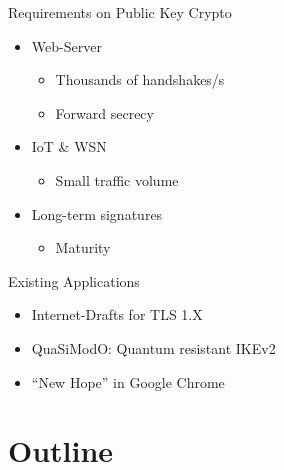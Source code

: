 \documentclass[fleqn,compress,utf8,aspectratio=169,t]{beamer}
\begin{document}
\begin{frame}{Requirements on Public Key Crypto}
  \begin{itemize}
    \item Web-Server
    \begin{itemize}
      \item Thousands of handshakes/s
      \item Forward secrecy
    \end{itemize}
  \end{itemize}
  \pause
  \begin{itemize}
    \item IoT \& WSN
    \begin{itemize}
      \item Small traffic volume
    \end{itemize}
  \end{itemize}
  \pause
  \begin{itemize}
    \item Long-term signatures
    \begin{itemize}
      \item Maturity
    \end{itemize}
  \end{itemize}
\end{frame}

\begin{frame}{Existing Applications}
  \begin{itemize}
    \item Internet-Drafts for TLS 1.X\cite{ietf-tls-hybrid-design-00}\cite{whyte-qsh-tls13-06}\cite{schanck-tls-additional-keyshare-00}\cite{kiefer-tls-ecdhe-sidh-00}\cite{whyte-qsh-tls12-02}
    \item QuaSiModO: Quantum resistant IKEv2\cite{exchangetowards}
    \item ``New Hope'' in Google Chrome\cite{cecpq1}
  \end{itemize}
\end{frame}

\section{Outline}
\end{document}
